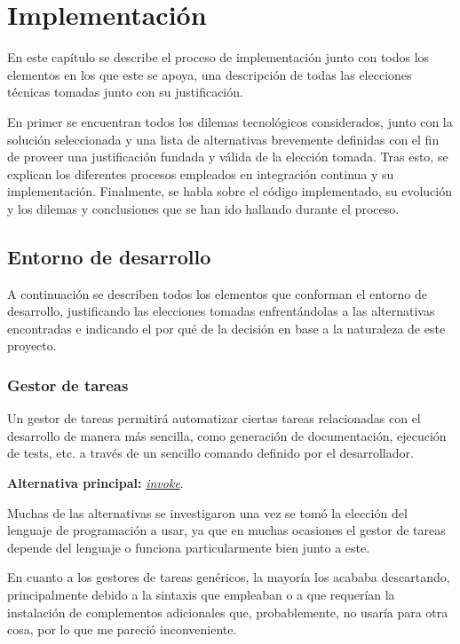 \chapter{Implementación}

En este capítulo se describe el proceso de implementación junto con todos los elementos en los que este se apoya, una descripción de todas las elecciones técnicas tomadas junto con su justificación.

En primer se encuentran todos los dilemas tecnológicos considerados, junto con la solución seleccionada y una lista de alternativas brevemente definidas con el fin de proveer una justificación fundada y válida de la elección tomada. Tras esto, se explican los diferentes procesos empleados en integración continua y su implementación. Finalmente, se habla sobre el código implementado, su evolución y los dilemas y conclusiones que se han ido hallando durante el proceso.


\section{Entorno de desarrollo}

A continuación se describen todos los elementos que conforman el entorno de desarrollo, justificando las elecciones tomadas enfrentándolas a las alternativas encontradas e indicando el por qué de la decisión en base a la naturaleza de este proyecto.

\subsection{Gestor de tareas}

Un gestor de tareas permitirá automatizar ciertas tareas relacionadas con el desarrollo de manera más sencilla, como generación de documentación, ejecución de tests, etc. a través de un sencillo comando definido por el desarrollador.


\textbf{Alternativa principal:} \href{https://www.pyinvoke.org/}{\textit{invoke}}.

Muchas de las alternativas se investigaron una vez se tomó la elección del lenguaje de programación a usar, ya que en muchas ocasiones el gestor de tareas depende del lenguaje o funciona particularmente bien junto a este. 

En cuanto a los gestores de tareas genéricos, la mayoría los acababa descartando, principalmente debido a la sintaxis que empleaban o a que requerían la instalación de complementos adicionales que, probablemente, no usaría para otra cosa, por lo que me pareció inconveniente.

